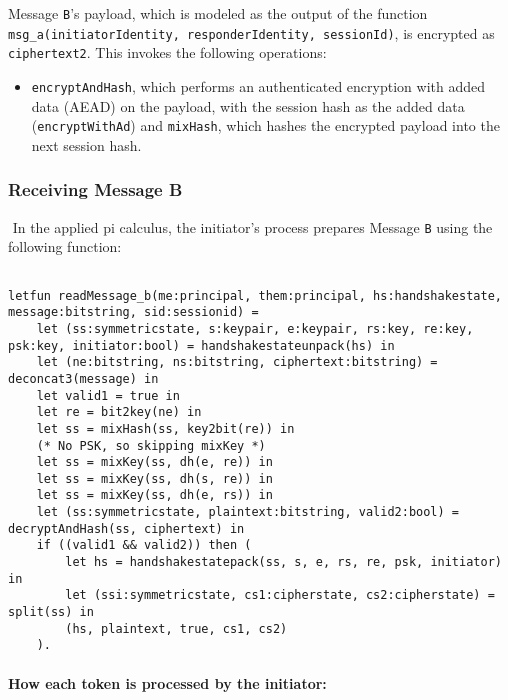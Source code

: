 Message \texttt{B}'s payload, which is modeled as the output of the function \texttt{msg\_a(initiatorIdentity, responderIdentity, sessionId)}, is encrypted as \texttt{ciphertext2}. This invokes the following operations:


\begin{itemize}

\item \texttt{encryptAndHash}, which performs an authenticated encryption with added data (AEAD) on the payload, with the session hash as the added data (\texttt{encryptWithAd}) and \texttt{mixHash}, which hashes the encrypted payload into the next session hash.

\end{itemize}
\subsubsection{Receiving Message B}$ $
In the applied pi calculus, the initiator's process prepares Message \texttt{B} using the following function:


\begin{lstlisting}

letfun readMessage_b(me:principal, them:principal, hs:handshakestate, message:bitstring, sid:sessionid) =
	let (ss:symmetricstate, s:keypair, e:keypair, rs:key, re:key, psk:key, initiator:bool) = handshakestateunpack(hs) in
	let (ne:bitstring, ns:bitstring, ciphertext:bitstring) = deconcat3(message) in
	let valid1 = true in
	let re = bit2key(ne) in
	let ss = mixHash(ss, key2bit(re)) in
	(* No PSK, so skipping mixKey *)
	let ss = mixKey(ss, dh(e, re)) in
	let ss = mixKey(ss, dh(s, re)) in
	let ss = mixKey(ss, dh(e, rs)) in
	let (ss:symmetricstate, plaintext:bitstring, valid2:bool) = decryptAndHash(ss, ciphertext) in
	if ((valid1 && valid2)) then (
		let hs = handshakestatepack(ss, s, e, rs, re, psk, initiator) in
		let (ssi:symmetricstate, cs1:cipherstate, cs2:cipherstate) = split(ss) in
		(hs, plaintext, true, cs1, cs2)
	).

\end{lstlisting}

\paragraph{How each token is processed by the initiator:}$ $

